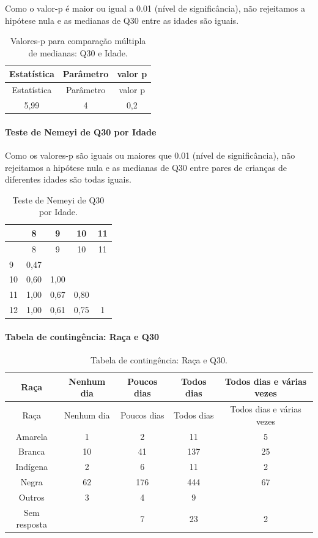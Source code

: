 \documentclass[]{article}
\let\oldparagraph\paragraph
\renewcommand{\paragraph}[1]{\oldparagraph{#1}\mbox{}}
\begin{document}
Como o valor-p é maior ou igual a 0.01 (nível de significância), não rejeitamos a hipótese nula e as medianas de Q30 entre as idades são iguais.

\begin{longtable}[]{@{}ccc@{}}
\caption{\label{tab:unnamed-chunk-984}Valores-p para comparação múltipla de medianas: Q30 e Idade.}\tabularnewline
\toprule
Estatística & Parâmetro & valor p\tabularnewline
\midrule
\endfirsthead
\toprule
Estatística & Parâmetro & valor p\tabularnewline
\midrule
\endhead
5,99 & 4 & 0,2\tabularnewline
\bottomrule
\end{longtable}

\hypertarget{teste-de-nemeyi-de-q30-por-idade}{%
\paragraph{Teste de Nemeyi de Q30 por Idade}\label{teste-de-nemeyi-de-q30-por-idade}}

Como os valores-p são iguais ou maiores que 0.01 (nível de significância), não rejeitamos a hipótese nula e as medianas de Q30 entre pares de crianças de diferentes idades são todas iguais.

\begin{longtable}[]{@{}lcccc@{}}
\caption{\label{tab:unnamed-chunk-986}Teste de Nemeyi de Q30 por Idade.}\tabularnewline
\toprule
& 8 & 9 & 10 & 11\tabularnewline
\midrule
\endfirsthead
\toprule
& 8 & 9 & 10 & 11\tabularnewline
\midrule
\endhead
9 & 0,47 & & &\tabularnewline
10 & 0,60 & 1,00 & &\tabularnewline
11 & 1,00 & 0,67 & 0,80 &\tabularnewline
12 & 1,00 & 0,61 & 0,75 & 1\tabularnewline
\bottomrule
\end{longtable}

\cleardoublepage

\hypertarget{tabela-de-continguxeancia-rauxe7a-e-q30}{%
\paragraph{Tabela de contingência: Raça e Q30}\label{tabela-de-continguxeancia-rauxe7a-e-q30}}

\begin{longtable}[]{@{}ccccc@{}}
\caption{\label{tab:unnamed-chunk-987}Tabela de contingência: Raça e Q30.}\tabularnewline
\toprule
Raça & Nenhum dia & Poucos dias & Todos dias & Todos dias e várias vezes\tabularnewline
\midrule
\endfirsthead
\toprule
Raça & Nenhum dia & Poucos dias & Todos dias & Todos dias e várias vezes\tabularnewline
\midrule
\endhead
Amarela & 1 & 2 & 11 & 5\tabularnewline
Branca & 10 & 41 & 137 & 25\tabularnewline
Indígena & 2 & 6 & 11 & 2\tabularnewline
Negra & 62 & 176 & 444 & 67\tabularnewline
Outros & 3 & 4 & 9 &\tabularnewline
Sem resposta & & 7 & 23 & 2\tabularnewline
\bottomrule
\end{longtable}
\end{document}
